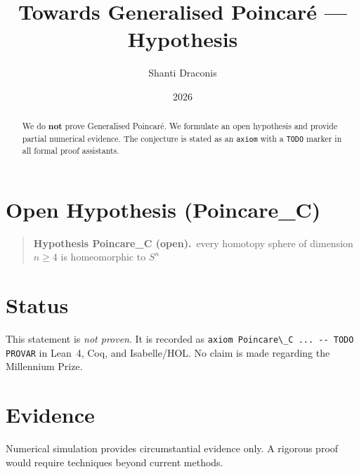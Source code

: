 \documentclass[11pt]{article}
\title{Towards Generalised Poincar\'e — Hypothesis}
\author{Shanti Draconis}
\date{2026}
\begin{document}
\maketitle

\begin{abstract}
We do \textbf{not} prove Generalised Poincar\'e.
We formulate an open hypothesis and provide partial numerical evidence.
The conjecture is stated as an \texttt{axiom} with a \texttt{TODO}
marker in all formal proof assistants.
\end{abstract}

\section{Open Hypothesis (Poincare\_C)}
\begin{quote}
  \textbf{Hypothesis Poincare\_C (open).}~every homotopy sphere of dimension $n \geq 4$ is homeomorphic to $S^n$
\end{quote}

\section{Status}
This statement is \emph{not proven}.  It is recorded as
\verb|axiom Poincare\_C ... -- TODO PROVAR| in Lean~4, Coq, and Isabelle/HOL.
No claim is made regarding the Millennium Prize.

\section{Evidence}
Numerical simulation provides circumstantial evidence only.
A rigorous proof would require techniques beyond current methods.
\end{document}
